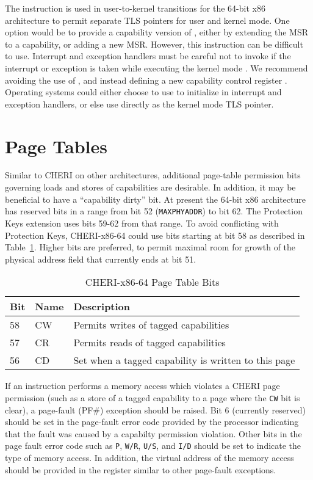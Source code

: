 The  instruction is used in user-to-kernel
transitions for the 64-bit x86 architecture to permit separate TLS
pointers for user and kernel mode.  One option would be to provide a
capability version of , either by extending the
\KGSBASE{} MSR to a capability, or adding a new MSR.  However, this
instruction can be difficult to use.  Interrupt and exception handlers
must be careful not to invoke  if the interrupt
or exception is taken while executing the kernel mode \GS{}.  We
recommend avoiding the use of , and instead defining
a new capability control register \KGS{}.  Operating systems could
either choose to use \KGS{} to initialize \CGS{} in interrupt and
exception handlers, or else use \KGS{} directly as the kernel mode TLS
pointer.

\section{Page Tables}

Similar to CHERI on other architectures, additional page-table
permission bits governing loads and stores of capabilities are
desirable.  In addition, it may be beneficial to have a ``capability
dirty'' bit.  At present the 64-bit x86 architecture has reserved bits
in a range from bit 52 (\texttt{MAXPHYADDR}) to bit 62.  The Protection Keys
extension uses bits 59-62 from that range.  To avoid conflicting with
Protection Keys, CHERI-x86-64 could use bits starting at bit 58 as described in Table~\ref{table:x86:pte}.  Higher bits are
preferred, to permit maximal room for growth of the physical address
field that currently ends at bit 51.

\begin{table}
\begin{center}
\begin{tabular}{lll}
\toprule
Bit & Name & Description \\
\midrule
58 & CW & Permits writes of tagged capabilities \\
57 & CR & Permits reads of tagged capabilities \\
56 & CD & Set when a tagged capability is written to this page \\
\bottomrule
\end{tabular}
\end{center}
\caption{CHERI-x86-64 Page Table Bits}
\label{table:x86:pte}
\end{table}

If an instruction performs a memory access which violates a CHERI page
permission (such as a store of a tagged capability to a page where the
\texttt{CW} bit is clear), a page-fault (PF\#) exception should be
raised.  Bit 6 (currently reserved) should be set in the page-fault
error code provided by the processor indicating that the fault was
caused by a capabilty permission violation.  Other bits in the page
fault error code such as \texttt{P}, \texttt{W/R}, \texttt{U/S}, and
\texttt{I/D} should be set to indicate the type of memory access.  In
addition, the virtual address of the memory access should be provided
in the \CRTWO{} register similar to other page-fault exceptions.

